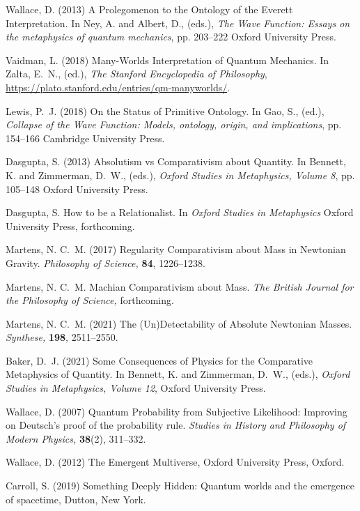 \documentclass[12pt,onecolumn,secnumarabic,amsmath,amssymb,balancelastpage,nofootinbib]{article}
\begin{document}
\begin{thebibliography}{100}
Wallace, D. (2013)
A Prolegomenon to the Ontology of the Everett Interpretation.
In Ney, A. and Albert, D., (eds.), \emph{The Wave Function: Essays on the
  metaphysics of quantum mechanics},  pp. 203--222 Oxford University Press.

Vaidman, L. (2018)
Many-Worlds Interpretation of Quantum Mechanics.
In Zalta, E.~N., (ed.), \emph{The {Stanford} Encyclopedia of Philosophy},
\url{https://plato.stanford.edu/entries/qm-manyworlds/}.

Lewis, P.~J. (2018)
On the Status of Primitive Ontology.
In Gao, S., (ed.), \emph{Collapse of the Wave Function: Models, ontology,
  origin, and implications},  pp. 154--166 Cambridge University Press.

Dasgupta, S. (2013)
Absolutism vs Comparativism about Quantity.
In Bennett, K. and Zimmerman, D.~W., (eds.), \emph{Oxford Studies in
  Metaphysics, Volume 8},  pp. 105--148 Oxford University Press.

Dasgupta, S.
How to be a Relationalist.
In \emph{Oxford Studies in Metaphysics} Oxford University Press,
forthcoming.

Martens, N. C.~M. (2017)
Regularity Comparativism about Mass in Newtonian Gravity.
{\em Philosophy of Science,} {\bf 84}, 1226--1238.

Martens, N. C.~M.
Machian Comparativism about Mass.
{\em The British Journal for the Philosophy of Science,}
forthcoming.

Martens, N. C.~M. (2021)
The (Un)Detectability of Absolute Newtonian Masses.
{\em Synthese,} {\bf 198}, 2511--2550.

Baker, D.~J. (2021)
Some Consequences of Physics for the Comparative Metaphysics of Quantity.
In Bennett, K. and Zimmerman, D.~W., (eds.), \emph{Oxford Studies in
  Metaphysics, Volume 12},  Oxford University Press.

Wallace, D. (2007)
Quantum Probability from Subjective Likelihood: Improving on Deutsch's proof of
  the probability rule.
{\em Studies in History and Philosophy of Modern Physics,} {\bf 38}(2),
  311--332.

Wallace, D. (2012)
The Emergent Multiverse,
Oxford University Press, Oxford.

Carroll, S. (2019)
Something Deeply Hidden: Quantum worlds and the emergence of spacetime,
Dutton, New York.


\end{thebibliography}
\end{document}
